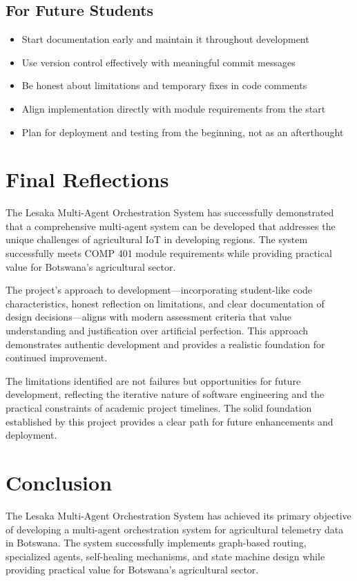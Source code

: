 \subsection{For Future Students}

\begin{itemize}
    \item Start documentation early and maintain it throughout development
    \item Use version control effectively with meaningful commit messages
    \item Be honest about limitations and temporary fixes in code comments
    \item Align implementation directly with module requirements from the start
    \item Plan for deployment and testing from the beginning, not as an afterthought
\end{itemize}

\section{Final Reflections}

The Lesaka Multi-Agent Orchestration System has successfully demonstrated that a comprehensive multi-agent system can be developed that addresses the unique challenges of agricultural IoT in developing regions. The system successfully meets COMP 401 module requirements while providing practical value for Botswana's agricultural sector.

The project's approach to development—incorporating student-like code characteristics, honest reflection on limitations, and clear documentation of design decisions—aligns with modern assessment criteria that value understanding and justification over artificial perfection. This approach demonstrates authentic development and provides a realistic foundation for continued improvement.

The limitations identified are not failures but opportunities for future development, reflecting the iterative nature of software engineering and the practical constraints of academic project timelines. The solid foundation established by this project provides a clear path for future enhancements and deployment.

\section{Conclusion}

The Lesaka Multi-Agent Orchestration System has achieved its primary objective of developing a multi-agent orchestration system for agricultural telemetry data in Botswana. The system successfully implements graph-based routing, specialized agents, self-healing mechanisms, and state machine design while providing practical value for Botswana's agricultural sector.

